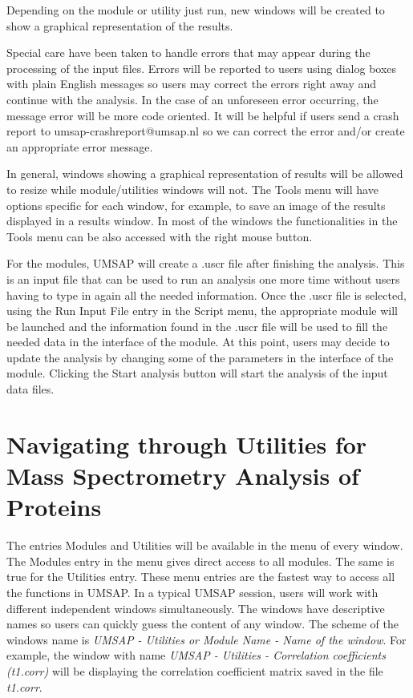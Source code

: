 Depending on the module or utility just run, new windows will be created to show a graphical representation of the results.

Special care have been taken to handle errors that may appear during the processing of the input files. Errors will be reported to users using dialog boxes with plain English messages so users may correct the errors right away and continue with the analysis. In the case of an unforeseen error occurring, the message error will be more code oriented. It will be helpful if users send a crash report to umsap-crashreport@umsap.nl so we can correct the error and/or create an appropriate error message. 

In general, windows showing a graphical representation of results will be allowed to resize while module/utilities windows will not. The Tools menu will have options specific for each window, for example, to save an image of the results displayed in a results window. In most of the windows the functionalities in the Tools menu can be also accessed with the right mouse button.

For the modules, UMSAP will create a .uscr file after finishing the analysis. This is an input file that can be used to run an analysis one more time without users having to type in again all the needed information. Once the .uscr file is selected, using the Run Input File entry in the Script menu, the appropriate module will be launched and the information found in the .uscr file will be used to fill the needed data in the interface of the module. At this point, users may decide to update the analysis by changing some of the parameters in the interface of the module. Clicking the Start analysis button will start the analysis of the input data files.   

\section{Navigating through Utilities for Mass Spectrometry Analysis of Proteins}

The entries Modules and Utilities will be available in the menu of every window. The Modules entry in the menu gives direct access to all modules. The same is true for the Utilities entry. These menu entries are the fastest way to access all the functions in UMSAP. In a typical UMSAP session, users will work with different independent windows simultaneously. The windows have descriptive names so users can quickly guess the content of any window. The scheme of the windows name is \textit{UMSAP - Utilities or Module Name - Name of the window}. For example, the window with name \textit{UMSAP - Utilities - Correlation coefficients (t\num[detect-all]{1}.corr)} will be displaying the correlation coefficient matrix saved in the file \textit{t\num{1}.corr}.

